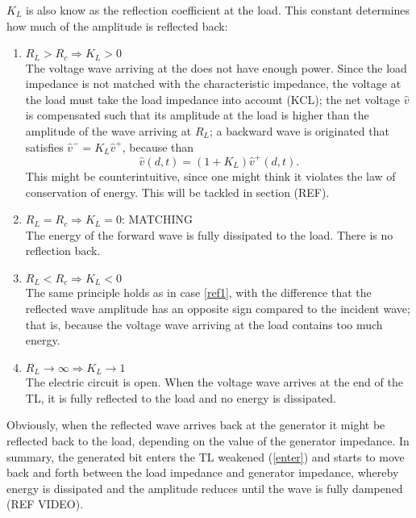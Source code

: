 $K_L$ is also know as the reflection coefficient at the load. This constant determines how much of the amplitude is reflected back:

\begin{enumerate}
\item $R_L > R_c \Rightarrow K_L > 0$ \label{ref1} \\
	The voltage wave arriving at the does not have enough power. Since the load impedance is not matched with the characteristic impedance, the voltage at the load must take the load impedance into account (KCL); the net voltage $\hat{v}$ is compensated such that its amplitude at the load is higher than the amplitude of the wave arriving at $R_L$; a backward wave is originated that satisfies $\hat{v}^{-} = K_L\hat{v}^{+}$, because than $$\hat{v}(d, t) = (1 + K_L)\hat{v}^{+}(d, t).$$ This might be counterintuitive, since one might think it violates the law of conservation of energy. This will be tackled in section (REF).
	
\item $R_L = R_c \Rightarrow K_L = 0$: MATCHING\\
	The energy of the forward wave is fully dissipated to the load. There is no reflection back.
	
\item $R_L < R_c \Rightarrow K_L <0$ \\
	The same principle holds as in case \ref{ref1}, with the difference that the reflected wave amplitude has an opposite sign compared to the incident wave; that is, because the voltage wave arriving at the load contains too much energy.

\item $R_L \longrightarrow \infty \Rightarrow K_L \longrightarrow 1$ \\
	The electric circuit is open. When the voltage wave arrives at the end of the TL, it is fully reflected to the load and no energy is dissipated.
	
\end{enumerate}
Obviously, when the reflected wave arrives back at the generator it might be reflected back to the load, depending on the value of the generator impedance. In summary, the generated bit enters the TL weakened (\ref{enter}) and starts to move back and forth between the load impedance and generator impedance, whereby energy is dissipated and the amplitude reduces until the wave is fully dampened (REF VIDEO).















